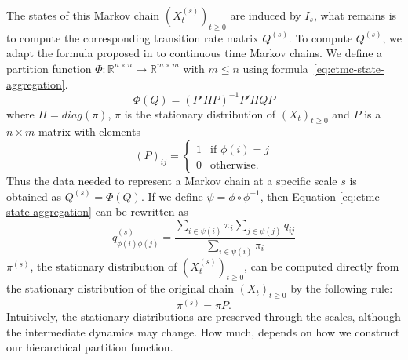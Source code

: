The states of this Markov chain $(X_t^{(s)})_{t \ge 0}$ are induced by $I_s$, what remains is to compute the corresponding  transition
rate matrix $Q^{(s)}$. To compute $Q^{(s)}$, we adapt the formula
proposed in \cite{5746509} to continuous time Markov chains. We define a partition function
$\Phi: \mathbb{R}^{n \times n} \rightarrow \mathbb{R}^{m \times m}$ with $m \le n$ using formula~\ref{eq:ctmc-state-aggregation}.
\begin{equation}
	\label{eq:ctmc-state-aggregation}
	\Phi(Q) = (P' \Pi P)^{-1} P' \Pi Q P
\end{equation}
where $\Pi = diag(\pi)$, $\pi$ is the stationary distribution of $(X_t)_{t \ge 0}$ and $P$ is a 
$n \times m$ matrix with elements
\begin{equation}
	\nonumber
	\left(P\right)_{ij} = 
		\left\{
			\begin{array}{ll}
				1 & \mbox{if } \phi(i) = j \\
				0 & \mbox{otherwise}.
			\end{array}
		\right.
\end{equation}
Thus the data needed to represent a Markov chain at a specific scale $s$ is obtained as $Q^{(s)} = \Phi(Q)$.
If we define $\psi = \phi \circ \phi^{-1}$, then Equation \ref{eq:ctmc-state-aggregation} can be rewritten as
\begin{equation}
	\nonumber
	q_{\phi(i)\phi(j)}^{(s)} = \frac{\sum\limits_{i \in \psi(i)}\pi_i \sum\limits_{j \in \psi(j)} q_{ij}}{\sum\limits_{i \in \psi(i)}\pi_i}
\end{equation}
$\pi^{(s)}$, the stationary distribution of $(X_t^{(s)})_{t \ge 0}$, can be computed directly from
the stationary distribution of the original chain $(X_t)_{t \ge 0}$ by the following rule:
\begin{equation}
	\nonumber
	\pi^{(s)} = \pi P.
\end{equation}
Intuitively, the stationary distributions are preserved through the scales, although the intermediate dynamics may change. How much, depends on how we construct our hierarchical partition function. 

